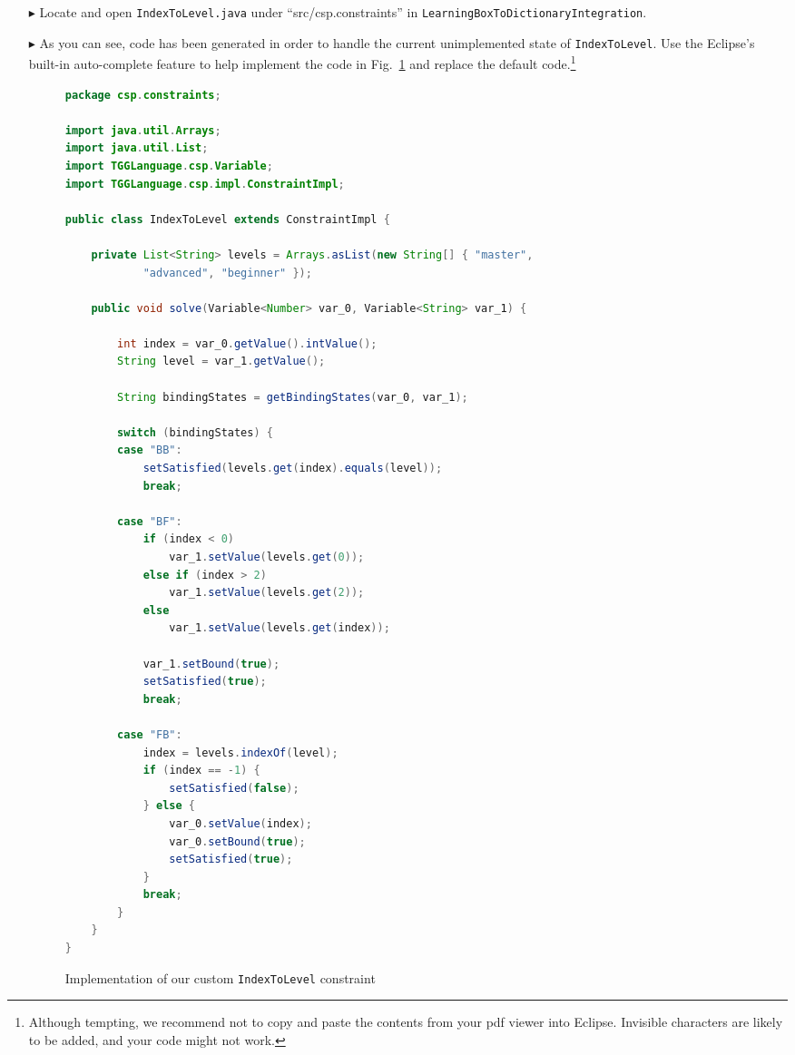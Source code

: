 \begin{itemize}
\item[$\blacktriangleright$] Locate and open \texttt{IndexToLevel.java} under ``src/csp.constraints'' in \texttt{LearningBoxToDictionaryIntegration}.

\item[$\blacktriangleright$] As you can see, code has been generated in order to handle the current unimplemented state of \texttt{IndexToLevel}. Use the
Eclipse's built-in auto-complete feature to help implement the code in Fig.~\ref{code:indexToLevel} and replace the default code.\footnote{Although tempting, we
recommend not to copy and paste the contents from your pdf viewer into Eclipse. Invisible characters are likely to be added, and your code might not work.}

\begin{figure}[htbp]
\begin{center}
\begin{lstlisting}[language=Java,backgroundcolor=\color{white}, keywordstyle={\bfseries\color{purple}}]
package csp.constraints;

import java.util.Arrays;
import java.util.List;
import TGGLanguage.csp.Variable;
import TGGLanguage.csp.impl.ConstraintImpl;

public class IndexToLevel extends ConstraintImpl {

	private List<String> levels = Arrays.asList(new String[] { "master",
			"advanced", "beginner" });

	public void solve(Variable<Number> var_0, Variable<String> var_1) {

		int index = var_0.getValue().intValue();
		String level = var_1.getValue();

		String bindingStates = getBindingStates(var_0, var_1);

		switch (bindingStates) {
		case "BB":
			setSatisfied(levels.get(index).equals(level));
			break;

		case "BF":
			if (index < 0)
				var_1.setValue(levels.get(0));
			else if (index > 2)
				var_1.setValue(levels.get(2));
			else
				var_1.setValue(levels.get(index));

			var_1.setBound(true);
			setSatisfied(true);
			break;

		case "FB":
			index = levels.indexOf(level);
			if (index == -1) {
				setSatisfied(false);
			} else {
				var_0.setValue(index);
				var_0.setBound(true);
				setSatisfied(true);
			}
			break;
		}
	}
}
\end{lstlisting}
  \caption{Implementation of our custom \texttt{IndexToLevel} constraint}
  \label{code:indexToLevel}
\end{center}
\end{figure}

\end{itemize}

